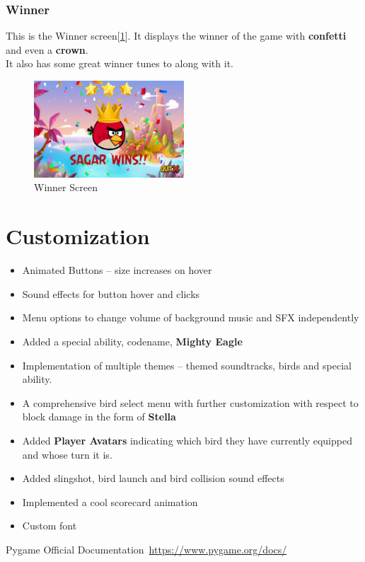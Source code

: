 \documentclass{article}
\begin{document}
\newpage
\subsubsection{Winner}
This is the Winner screen[\ref{fig:Winner}]. It displays the winner of the game with \textbf{confetti} and even a \textbf{crown}.\\
It also has some great winner tunes to along with it.
\begin{figure}[h]
    \centering
    \includegraphics[width=0.5\textwidth]{Winner.png}
    \caption{Winner Screen}\label{fig:Winner}
\end{figure}

\section{Customization}
\begin{itemize}
    \item Animated Buttons -- size increases on hover
    \item Sound effects for button hover and clicks
    \item Menu options to change volume of background music and SFX independently
    \item Added a special ability, codename, \textbf{Mighty Eagle}
    \item Implementation of multiple themes -- themed soundtracks, birds and special ability.
    \item A comprehensive bird select menu with further customization with respect to block damage in the form of \textbf{Stella}
    \item Added \textbf{Player Avatars} indicating which bird they have currently equipped and whose turn it is.
    \item Added slingshot, bird launch and bird collision sound effects
    \item Implemented a cool scorecard animation
    \item Custom font
\end{itemize}

\begin{thebibliography}{9}
    Pygame Official Documentation\
    \url{https://www.pygame.org/docs/}
\end{thebibliography}
\end{document}
